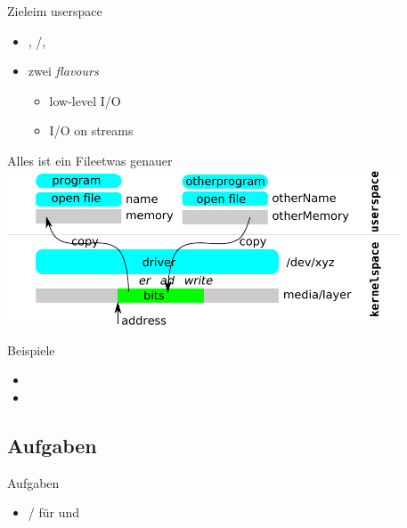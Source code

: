 \begin{frame}{Ziele}{im userspace}
 \begin{itemize}
  \item {}, /, 
  \item zwei {\em flavours}
  \begin{itemize}
   \item low-level I/O
   \item I/O on streams
  \end{itemize}
 \end{itemize}
\end{frame}

\begin{frame}{Alles ist ein File}{etwas genauer}
\includegraphics[width=0.875\textwidth]{driver-file.pdf}
%
\end{frame}


\begin{frame}{Beispiele}
 \begin{itemize}
  \item {}
  \item {}
 \end{itemize}
\end{frame}

\subsection{Aufgaben}
\begin{frame}{Aufgaben}
\begin{itemize}
 \item {}/ für \host und \targetS
\end{itemize}
\end{frame}
